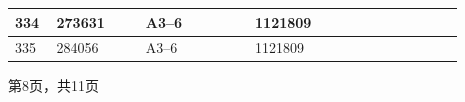 \documentclass[UTF8,10pt,a4paper,fontset=fandol]{ctexart}
\newcommand{\fieldvalue}[1]{#1}
\begin{document}
\begin{center}
\begin{tabular}{|p{0.07\linewidth}|p{0.18\linewidth}|p{0.22\linewidth}|p{0.22\linewidth}|p{0.20\linewidth}|}
\fieldvalue{334} &
\fieldvalue{273631} &
\fieldvalue{A3--6} &
\fieldvalue{1121809} & \\ \hline
\fieldvalue{335} &
\fieldvalue{284056} &
\fieldvalue{A3--6} &
\fieldvalue{1121809} & \\ \hline
\end{tabular}

\vspace{0.5em}

第8页，共11页
\end{center}

\newpage
\end{document}
